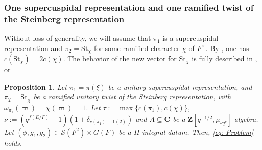 \documentclass{amsart}
\theoremstyle{plain}
\newtheorem{prop}[thm]{Proposition}
\theoremstyle{plain}
\theoremstyle{remark}
\begin{document}
\subsubsection{One supercuspidal representation and one ramified twist of the Steinberg representation}
Without loss of generality, we will assume that $\pi_1$ is a supercuspidal representation and $\pi_2=\mathrm{St}_\chi$ for some ramified character $\chi$ of $F^\times$. By \cite{schmidt2002some}, one has $c(\mathrm{St}_\chi)=2c(\chi)$. The behavior of the new vector for $\mathrm{St}_\chi$ is fully described in \cite[Lemma $3.3$]{Assing_2018}, or \cite[Lemma $3.3.4$]{Assing_2019} 
\begin{prop}\label{thm sup x ram St}
    Let $\pi_1=\pi(\xi)$ be a unitary supercuspidal representation, and $\pi_2=\mathrm{St}_\chi$ be a ramified unitary twist of the Steinberg representation, with $\omega_{\pi_1}(\varpi)=\chi(\varpi)=1$. Let $\tau:=\max\{c(\pi_1),c(\chi)\}$, $\nu:=(q^{f(E/F)}-1)(1+\delta_{c(\pi_1)\equiv 1(2)})$ and $A\subseteq \mathbf{C}$ be a $\mathbf{Z}[q^{-1/2},\mu_{\nu q^\tau}]$-algebra. Let $(\phi,g_1,g_2)\in\mathcal
    S(F^2)\times G(F)$ be a $\Pi$-integral datum. Then, \eqref{eq: Problem} holds.
\end{prop}
\end{document}
